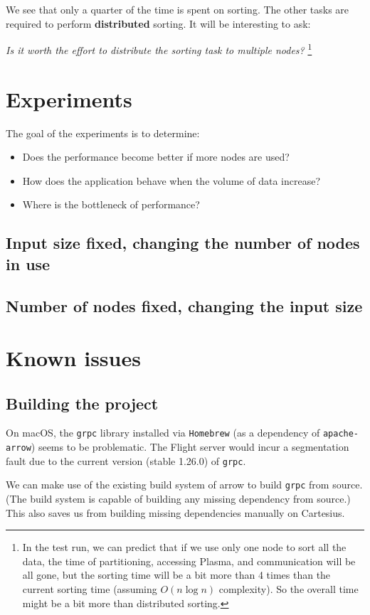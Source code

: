 \documentclass{article}
\begin{document}
We see that only a quarter of the time is spent on sorting.
The other tasks are required to perform \textbf{distributed} sorting.
It will be interesting to ask: 

\textit{Is it worth the effort to distribute the sorting task to multiple nodes?}
\footnote{In the test run, we can predict that if we use only one node to sort all the data,
the time of partitioning, accessing Plasma, and communication will be all gone,
 but the sorting time will be a bit more than 4 times than the current sorting time (assuming $O(n\log{}n)$ complexity).
So the overall time might be a bit more than distributed sorting.}

\section{Experiments}

The goal of the experiments is to determine:
\begin{itemize}
    \item Does the performance become better if more nodes are used?
    \item How does the application behave when the volume of data increase?
    \item Where is the bottleneck of performance?
\end{itemize}

\subsection{Input size fixed, changing the number of nodes in use}

\subsection{Number of nodes fixed, changing the input size}

\newpage
\appendix
\section{Known issues}
\subsection{Building the project}

On macOS, the \texttt{grpc} library installed via \texttt{Homebrew} (as a dependency of \texttt{apache-arrow}) seems to be problematic.
The Flight server would incur a segmentation fault due to the current version (stable 1.26.0) of \texttt{grpc}.

We can make use of the existing build system of arrow to build \texttt{grpc} from source.
(The build system is capable of building any missing dependency from source.)
This also saves us from building missing dependencies manually on Cartesius.
\end{document}
